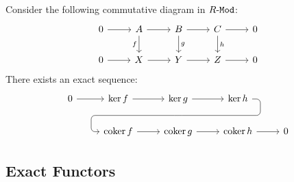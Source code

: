 \begin{lemma}
    \label{lem:snake-lemma}
    Consider the following commutative diagram in \({R\text{-}\texttt{Mod}}\):
    \[
        \begin{tikzcd}
            0 \ar[r]
            &A \ar[d, "f"'] \ar[r]
            &B \ar[r] \ar[d, "g"]
            &C \ar[r] \ar[d, "h"]
            &0
            \\
            0 \ar[r]
            &X \ar[r]
            &Y \ar[r]
            &Z \ar[r]
            &0
        \end{tikzcd}
    \]
    There exists an exact sequence:
    \[
        \begin{tikzcd}
            0 \ar[r]
            &\ker f \ar[r]
            &\ker g \ar[r]
            \ar[d, phantom, ""{coordinate, name=Z}]
            &\ker h
            \ar[
                dll,
                rounded corners,
                to path={ -- ([xshift=2ex]\tikztostart.east)
                        |- (Z) [near end]\tikztonodes
                        -| ([xshift=-2ex]\tikztotarget.west)
                        -- (\tikztotarget)}
            ]
            \\
            &\coker f \ar[r]
            &\coker g \ar[r]
            &\coker h \ar[r]
            &0
        \end{tikzcd}
    \]
\end{lemma}

\subsection{Exact Functors}

